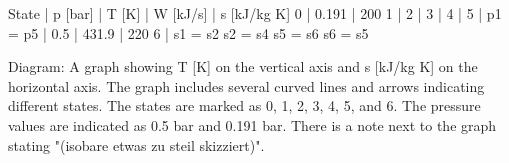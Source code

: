 State | p [bar] | T [K] | W [kJ/s] | s [kJ/kg K]
0 | 0.191 | 200
1 | 
2 | 
3 | 
4 | 
5 | p1 = p5 | 0.5 | 431.9 | 220
6 | 
s1 = s2
s2 = s4
s5 = s6
s6 = s5

Diagram: A graph showing T [K] on the vertical axis and s [kJ/kg K] on the horizontal axis. The graph includes several curved lines and arrows indicating different states. The states are marked as 0, 1, 2, 3, 4, 5, and 6. The pressure values are indicated as 0.5 bar and 0.191 bar. There is a note next to the graph stating "(isobare etwas zu steil skizziert)".